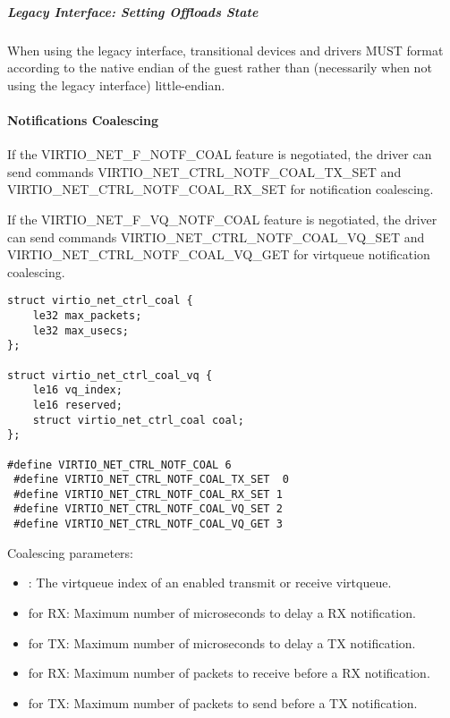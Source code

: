 \subparagraph{Legacy Interface: Setting Offloads State}\label{sec:Device Types / Network Device / Device Operation / Control Virtqueue / Offloads State Configuration / Setting Offloads State / Legacy Interface: Setting Offloads State}
When using the legacy interface, transitional devices and drivers
MUST format 
according to the native endian of the guest rather than
(necessarily when not using the legacy interface) little-endian.


\paragraph{Notifications Coalescing}\label{sec:Device Types / Network Device / Device Operation / Control Virtqueue / Notifications Coalescing}

If the VIRTIO_NET_F_NOTF_COAL feature is negotiated, the driver can
send commands VIRTIO_NET_CTRL_NOTF_COAL_TX_SET and VIRTIO_NET_CTRL_NOTF_COAL_RX_SET
for notification coalescing.

If the VIRTIO_NET_F_VQ_NOTF_COAL feature is negotiated, the driver can
send commands VIRTIO_NET_CTRL_NOTF_COAL_VQ_SET and VIRTIO_NET_CTRL_NOTF_COAL_VQ_GET
for virtqueue notification coalescing.

\begin{lstlisting}
struct virtio_net_ctrl_coal {
    le32 max_packets;
    le32 max_usecs;
};

struct virtio_net_ctrl_coal_vq {
    le16 vq_index;
    le16 reserved;
    struct virtio_net_ctrl_coal coal;
};

#define VIRTIO_NET_CTRL_NOTF_COAL 6
 #define VIRTIO_NET_CTRL_NOTF_COAL_TX_SET  0
 #define VIRTIO_NET_CTRL_NOTF_COAL_RX_SET 1
 #define VIRTIO_NET_CTRL_NOTF_COAL_VQ_SET 2
 #define VIRTIO_NET_CTRL_NOTF_COAL_VQ_GET 3
\end{lstlisting}

Coalescing parameters:
\begin{itemize}
\item {}: The virtqueue index of an enabled transmit or receive virtqueue.
\item {} for RX: Maximum number of microseconds to delay a RX notification.
\item {} for TX: Maximum number of microseconds to delay a TX notification.
\item {} for RX: Maximum number of packets to receive before a RX notification.
\item {} for TX: Maximum number of packets to send before a TX notification.
\end{itemize}

